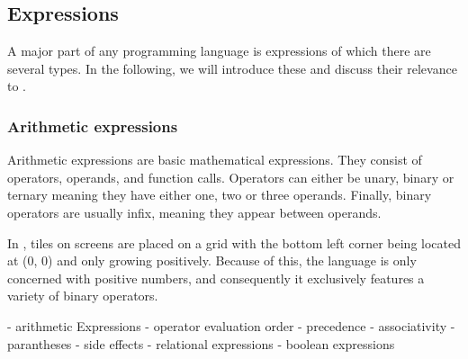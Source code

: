\subsection{Expressions}
A major part of any programming language is expressions of which there are several types.
In the following, we will introduce these and discuss their relevance to \dazel{}.

\subsubsection*{Arithmetic expressions}
Arithmetic expressions are basic mathematical expressions. 
They consist of operators, operands, and function calls. 
Operators can either be unary, binary or ternary meaning they have either one, two or three operands.
Finally, binary operators are usually infix, meaning they appear between operands.

In \dazel{}, tiles on screens are placed on a grid with the bottom left corner being located at (0, 0) and only growing positively.
Because of this, the language is only concerned with positive numbers, and consequently it exclusively features a variety of binary operators. 

- arithmetic Expressions
- operator evaluation order
	- precedence
	- associativity
	- parantheses
	- side effects
- relational expressions
- boolean expressions
